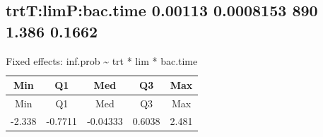 \documentclass[]{article}
\begin{document}
\subsection{\texorpdfstring{\textbf{trtT:limP:bac.time} 0.00113
0.0008153 890 1.386
0.1662}{trtT:limP:bac.time 0.00113 0.0008153 890 1.386 0.1662}}\label{trttlimpbac.time-0.00113-0.0008153-890-1.386-0.1662}

\begin{longtable}[]{@{}ccccc@{}}
\caption{Fixed effects: inf.prob \textasciitilde{} trt * lim *
bac.time}\tabularnewline
\toprule
\begin{minipage}[b]{0.08\columnwidth}\centering\strut
Min\strut
\end{minipage} & \begin{minipage}[b]{0.10\columnwidth}\centering\strut
Q1\strut
\end{minipage} & \begin{minipage}[b]{0.11\columnwidth}\centering\strut
Med\strut
\end{minipage} & \begin{minipage}[b]{0.08\columnwidth}\centering\strut
Q3\strut
\end{minipage} & \begin{minipage}[b]{0.08\columnwidth}\centering\strut
Max\strut
\end{minipage}\tabularnewline
\midrule
\endfirsthead
\toprule
\begin{minipage}[b]{0.08\columnwidth}\centering\strut
Min\strut
\end{minipage} & \begin{minipage}[b]{0.10\columnwidth}\centering\strut
Q1\strut
\end{minipage} & \begin{minipage}[b]{0.11\columnwidth}\centering\strut
Med\strut
\end{minipage} & \begin{minipage}[b]{0.08\columnwidth}\centering\strut
Q3\strut
\end{minipage} & \begin{minipage}[b]{0.08\columnwidth}\centering\strut
Max\strut
\end{minipage}\tabularnewline
\midrule
\endhead
\begin{minipage}[t]{0.08\columnwidth}\centering\strut
-2.338\strut
\end{minipage} & \begin{minipage}[t]{0.10\columnwidth}\centering\strut
-0.7711\strut
\end{minipage} & \begin{minipage}[t]{0.11\columnwidth}\centering\strut
-0.04333\strut
\end{minipage} & \begin{minipage}[t]{0.08\columnwidth}\centering\strut
0.6038\strut
\end{minipage} & \begin{minipage}[t]{0.08\columnwidth}\centering\strut
2.481\strut
\end{minipage}\tabularnewline
\bottomrule
\end{longtable}
\end{document}
